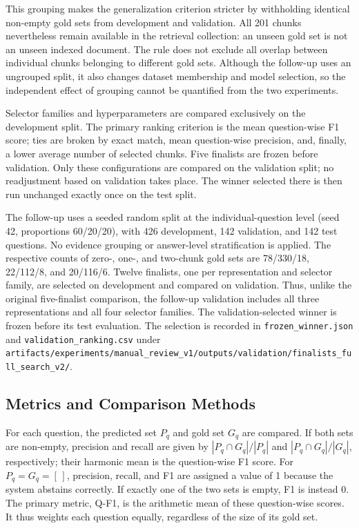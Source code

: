 \documentclass[11pt]{article}
\newcommand{\revision}[1]{{\color{blue}#1}}
\begin{document}
\revision{This grouping makes the generalization criterion stricter by withholding identical non-empty gold sets from development and validation. All 201 chunks nevertheless remain available in the retrieval collection: an unseen gold set is not an unseen indexed document. The rule does not exclude all overlap between individual chunks belonging to different gold sets. Although the follow-up uses an ungrouped split, it also changes dataset membership and model selection, so the independent effect of grouping cannot be quantified from the two experiments.}

Selector families and hyperparameters are compared exclusively on the development split. The primary ranking criterion is the mean question-wise F1 score; ties are broken by exact match, mean question-wise precision, and, finally, a lower average number of selected chunks. Five finalists are frozen before validation. Only these configurations are compared on the validation split; no readjustment based on validation takes place. The winner selected there is then run unchanged exactly once on the test split.

\revision{The follow-up uses a seeded random split at the individual-question level (seed 42, proportions 60/20/20), with 426 development, 142 validation, and 142 test questions. No evidence grouping or answer-level stratification is applied. The respective counts of zero-, one-, and two-chunk gold sets are 78/330/18, 22/112/8, and 20/116/6. Twelve finalists, one per representation and selector family, are selected on development and compared on validation. Thus, unlike the original five-finalist comparison, the follow-up validation includes all three representations and all four selector families. The validation-selected winner is frozen before its test evaluation. The selection is recorded in \nolinkurl{frozen_winner.json} and \nolinkurl{validation_ranking.csv} under \nolinkurl{artifacts/experiments/manual_review_v1/outputs/validation/finalists_full_search_v2/}.}

\subsection{Metrics and Comparison Methods}

For each question, the predicted set $P_q$ and gold set $G_q$ are compared. If both sets are non-empty, precision and recall are given by $|P_q\cap G_q|/|P_q|$ and $|P_q\cap G_q|/|G_q|$, respectively; their harmonic mean is the question-wise F1 score. For $P_q=G_q=[\,]$, precision, recall, and F1 are assigned a value of 1 because the system abstains correctly. If exactly one of the two sets is empty, F1 is instead 0. The primary metric, Q-F1, is the arithmetic mean of these question-wise scores. It thus weights each question equally, regardless of the size of its gold set.
\end{document}
